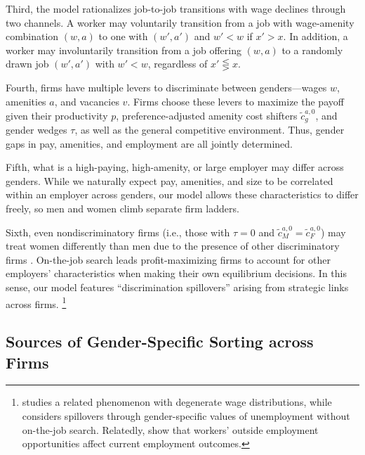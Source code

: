 Third, the model rationalizes job-to-job transitions with wage declines through two channels. A worker may voluntarily transition from a job with wage-amenity combination $(w, a)$ to one with $(w', a')$ and $w' < w$ if $x' > x$. In addition, a worker may involuntarily transition from a job offering $(w, a)$ to a randomly drawn job $(w', a')$ with $w' < w$, regardless of $x' \lesseqgtr x$.

Fourth, firms have multiple levers to discriminate between genders---wages $w$, amenities $a$, and vacancies $v$. Firms choose these levers to maximize the payoff given their productivity $p$, preference-adjusted amenity cost shifters $\tilde{c}_{g}^{a,0}$, and gender wedges $\tau$, as well as the general competitive environment. Thus, gender gaps in pay, amenities, and employment are all jointly determined.

Fifth, what is a high-paying, high-amenity, or large employer may differ across genders. While we naturally expect pay, amenities, and size to be correlated within an employer across genders, our model allows these characteristics to differ freely, so men and women climb separate firm ladders.

Sixth, even nondiscriminatory firms (i.e., those with $\tau = 0$ and $\tilde{c}_{M}^{a,0} = \tilde{c}_{F}^{a,0}$) may treat women differently than men due to the presence of other discriminatory firms \citep[i.e., those with $\tau \neq 0$, as in][or $\tilde{c}_{M}^{a,0} \neq \tilde{c}_{F}^{a,0}$]{becker1971}. On-the-job search leads profit-maximizing firms to account for other employers' characteristics when making their own equilibrium decisions. In this sense, our model features ``discrimination spillovers'' arising from strategic links across firms.%
%
\footnote{\citet{Black1995} studies a related phenomenon with degenerate wage distributions, while \citet{Flabbi2010} considers spillovers through gender-specific values of unemployment without on-the-job search. Relatedly, \citet{CaldwellDanieli2024} show that workers' outside employment opportunities affect current employment outcomes.} %
%


\subsection{Sources of Gender-Specific Sorting across Firms\label{subsec:sorting}}

